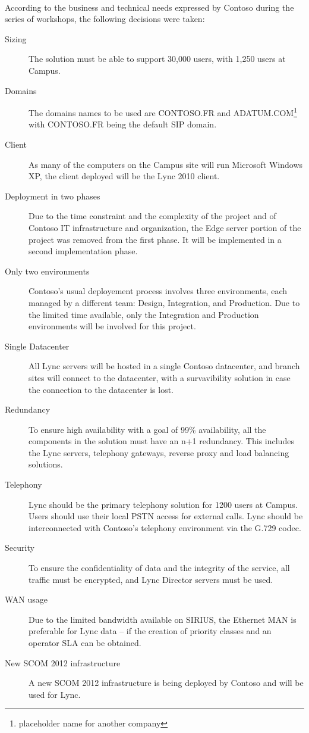 	\paragraph{}
		According to the business and technical needs expressed by Contoso during the series of workshops, the following decisions were taken:
		\begin{description}
			\item[Sizing] The solution must be able to support 30,000 users, with 1,250 users at Campus.
			\item[Domains] The domains names to be used are CONTOSO.FR and ADATUM.COM\footnote{placeholder name for another company} with CONTOSO.FR being the default SIP domain.
			\item[Client] As many of the computers on the Campus site will run Microsoft Windows XP, the client deployed will be the Lync 2010 client.
			\item[Deployment in two phases] Due to the time constraint and the complexity of the project and of Contoso IT infrastructure and organization, the Edge server portion of the project was removed from the first phase. It will be implemented in a second implementation phase.
			\item[Only two environments] Contoso's usual deployement process involves three environments, each managed by a different team: Design, Integration, and Production. Due to the limited time available, only the Integration and Production environments will be involved for this project.
			\item[Single Datacenter] All Lync servers will be hosted in a single Contoso datacenter, and branch sites will connect to the datacenter, with a survavibility solution in case the connection to the datacenter is lost.
			\item[Redundancy] To ensure high availability with a goal of 99\% availability, all the components in the solution must have an n+1 redundancy. This includes the Lync servers, telephony gateways, reverse proxy and load balancing solutions.
			\item[Telephony] Lync should be the primary telephony solution for 1200 users at Campus. Users should use their local PSTN access for external calls. Lync should be interconnected with Contoso's telephony environment via the G.729 codec.
			\item[Security] To ensure the confidentiality of data and the integrity of the service, all traffic must be encrypted, and Lync Director servers must be used.
			\item[WAN usage] Due to the limited bandwidth available on SIRIUS, the Ethernet MAN is preferable for Lync data -- if the creation of priority classes and an operator SLA can be obtained.
			\item[New SCOM 2012 infrastructure] A new SCOM 2012 infrastructure is being deployed by Contoso and will be used for Lync.
		\end{description}


